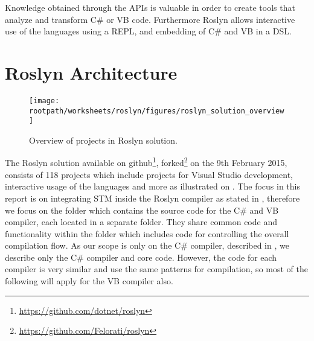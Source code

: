 Knowledge obtained through the \acp{API} is valuable in order to create tools that analyze and transform C\# or \ac{VB} code. Furthermore Roslyn allows interactive use of the languages using a \ac{REPL}\cite{cSharp2012interactive}, and embedding of  C\# and \ac{VB} in a \ac{DSL}\cite[p. 3]{ng2012roslyn}.


\section{Roslyn Architecture}\label{sec:roslyn_archi}
\begin{figure}[htbp]
\centering
 \texttt{[image: \\rootpath/worksheets/roslyn/figures/roslyn\_solution\_overview]} 
 \caption{Overview of projects in Roslyn solution.}
\label{fig:roslyn_solution_overview}
\end{figure}

The Roslyn solution available on github\footnote{\url{https://github.com/dotnet/roslyn}}, forked\footnote{\url{https://github.com/Felorati/roslyn}} on the 9th February 2015, consists of 118 projects which include projects for Visual Studio development, interactive usage of the languages and more as illustrated on . The focus in this report is on integrating \ac{STM} inside the Roslyn compiler as stated in , therefore we focus on the  folder which contains the source code for the C\# and \ac{VB} compiler, each located in a separate folder. They share common code and functionality within the  folder which includes code for controlling the overall compilation flow. As our scope is only on the C\# compiler, described in , we describe only the C\# compiler and core code. However, the code for each compiler is very similar and use the same patterns for compilation\cite[09:36-10:36]{campbellDeeperRos}, so most of the following will apply for the \ac{VB} compiler also.

